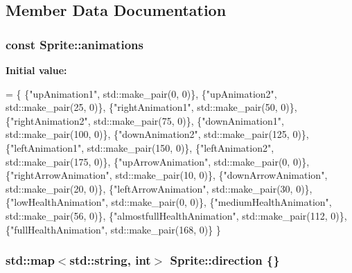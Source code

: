 \subsection{Member Data Documentation}
\hypertarget{classSprite_aba52ded16f7623eb5f2ee63ece6ab896}{
\subsubsection[{animations}]{ const Sprite\-::animations\hspace{0.3cm}{\ttfamily [protected]}}}\label{classSprite_aba52ded16f7623eb5f2ee63ece6ab896}
{\bfseries Initial value\-:}
\begin{DoxyCode}
=
        \{
                    \{\textcolor{stringliteral}{"upAnimation1"}, std::make\_pair(0, 0)\},
                    \{\textcolor{stringliteral}{"upAnimation2"}, std::make\_pair(25, 0)\},
                    \{\textcolor{stringliteral}{"rightAnimation1"}, std::make\_pair(50, 0)\},
                    \{\textcolor{stringliteral}{"rightAnimation2"}, std::make\_pair(75, 0)\},
                    \{\textcolor{stringliteral}{"downAnimation1"}, std::make\_pair(100, 0)\},
                    \{\textcolor{stringliteral}{"downAnimation2"}, std::make\_pair(125, 0)\},
                    \{\textcolor{stringliteral}{"leftAnimation1"}, std::make\_pair(150, 0)\},
                    \{\textcolor{stringliteral}{"leftAnimation2"}, std::make\_pair(175, 0)\},
                    \{\textcolor{stringliteral}{"upArrowAnimation"}, std::make\_pair(0, 0)\},
                    \{\textcolor{stringliteral}{"rightArrowAnimation"}, std::make\_pair(10, 0)\},
                    \{\textcolor{stringliteral}{"downArrowAnimation"}, std::make\_pair(20, 0)\},
                    \{\textcolor{stringliteral}{"leftArrowAnimation"}, std::make\_pair(30, 0)\},
                    \{\textcolor{stringliteral}{"lowHealthAnimation"}, std::make\_pair(0, 0)\},
                    \{\textcolor{stringliteral}{"mediumHealthAnimation"}, std::make\_pair(56, 0)\},
                    \{\textcolor{stringliteral}{"almostfullHealthAnimation"}, std::make\_pair(112, 0)\},
                    \{\textcolor{stringliteral}{"fullHealthAnimation"}, std::make\_pair(168, 0)\}
        \}
\end{DoxyCode}
\hypertarget{classSprite_a660cef010618bdc48d706e0b3ab87177}{
\subsubsection[{direction}]{\setlength{\rightskip}{0pt plus 5cm}std\-::map$<$std\-::string, int$>$ Sprite\-::direction \{\}\hspace{0.3cm}{\ttfamily [protected]}}}\label{classSprite_a660cef010618bdc48d706e0b3ab87177}
